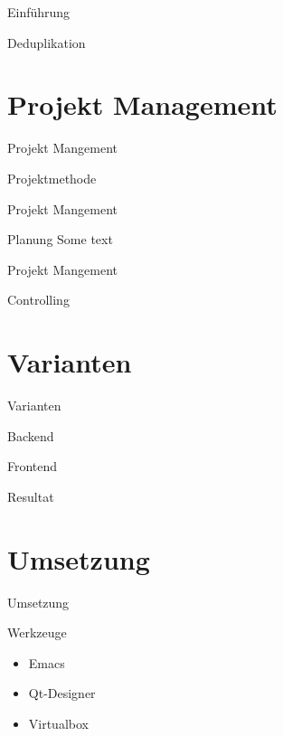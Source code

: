 \documentclass[aspectratio=1610]{beamer}
\begin{document}
\begin{frame}[label={sec:orgf24b504}]{Einführung}
\begin{block}{Deduplikation}
\end{block}
\end{frame}


\section{Projekt Management}
\label{sec:org53db976}
\begin{frame}[label={sec:orge311931}]{Projekt Mangement}
\begin{block}{Projektmethode}
\end{block}
\end{frame}


\begin{frame}[label={sec:orgfc90a0e}]{Projekt Mangement}
\begin{block}{Planung}
Some text
\end{block}
\end{frame}

\begin{frame}[label={sec:org1e305d7}]{Projekt Mangement}
\begin{block}{Controlling}
\end{block}
\end{frame}

\section{Varianten}
\label{sec:org39ae06a}
\begin{frame}[label={sec:orged7a56a}]{Varianten}
\begin{block}{Backend}
\end{block}

\begin{block}{Frontend}
\end{block}

\begin{block}{Resultat}
\end{block}
\end{frame}

\section{Umsetzung}
\label{sec:orgc54cdd6}
\begin{frame}[label={sec:org05474ad}]{Umsetzung}
\begin{block}{Werkzeuge}
\begin{itemize}
\item Emacs
\item Qt-Designer
\item Virtualbox
\end{itemize}
\end{block}
\end{frame}
\end{document}
